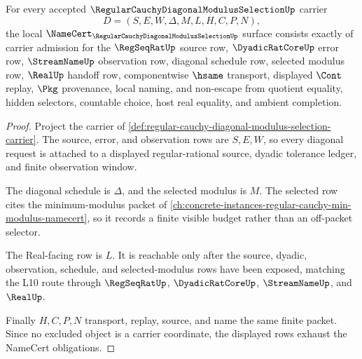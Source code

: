 \begin{theorem}
\label{thm:regular-cauchy-diagonal-modulus-selection-obligations}
For every accepted $\RegularCauchyDiagonalModulusSelectionUp$ carrier
$$
D=(S,E,W,\Delta,M,L,H,C,P,N),
$$
the local $\NameCert_{\RegularCauchyDiagonalModulusSelectionUp}$ surface consists exactly of carrier admission for the $\RegSeqRatUp$ source row, $\DyadicRatCoreUp$ error row, $\StreamNameUp$ observation row, diagonal schedule row, selected modulus row, $\RealUp$ handoff row, componentwise $\hsame$ transport, displayed $\Cont$ replay, $\Pkg$ provenance, local naming, and non-escape from quotient equality, hidden selectors, countable choice, host real equality, and ambient completion.
\end{theorem}
\begin{proof}
Project the carrier of \autoref{def:regular-cauchy-diagonal-modulus-selection-carrier}. The source, error, and observation rows are $S,E,W$, so every diagonal request is attached to a displayed regular-rational source, dyadic tolerance ledger, and finite observation window.

The diagonal schedule is $\Delta$, and the selected modulus is $M$. The selected row cites the minimum-modulus packet of \autoref{ch:concrete-instances-regular-cauchy-min-modulus-namecert}, so it records a finite visible budget rather than an off-packet selector.

The Real-facing row is $L$. It is reachable only after the source, dyadic, observation, schedule, and selected-modulus rows have been exposed, matching the L10 route through $\RegSeqRatUp$, $\DyadicRatCoreUp$, $\StreamNameUp$, and $\RealUp$.

Finally $H,C,P,N$ transport, replay, source, and name the same finite packet. Since no excluded object is a carrier coordinate, the displayed rows exhaust the NameCert obligations.
\end{proof}

